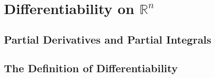 \setcounter{chapter}{10}
\chapter{Differentiability on $\mathbb{R}^n$}
\thispagestyle{empty}
\newpage

\section{Partial Derivatives and Partial Integrals}

\setcounter{Exercise}{1}


\vspace{12pt}

\setcounter{Exercise}{3}


\vspace{12pt}




\section{The Definition of Differentiability}

\setcounter{Exercise}{1}


\vspace{12pt}



\vspace{12pt}



\vspace{12pt}



\vspace{12pt}



\vspace{12pt}

\setcounter{Exercise}{7}


\vspace{12pt}



\vspace{12pt}

\setcounter{Exercise}{10}



